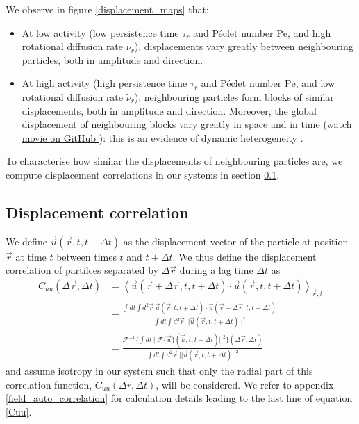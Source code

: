 \documentclass[class=report, float=false, crop=false]{standalone}
\begin{document}
We observe in figure \ref{displacement_maps} that:
\begin{itemize}
  \item At low activity (low persistence time $\tau_r$ and P\'eclet number $\text{Pe}$, and high rotational diffusion rate $\tilde{\nu}_r$), displacements vary greatly between neighbouring particles, both in amplitude and direction.
  \item At high activity (high persistence time $\tau_r$ and P\'eclet number $\text{Pe}$, and low rotational diffusion rate $\tilde{\nu}_r$), neighbouring particles form blocks of similar displacements, both in amplitude and direction. Moreover, the global displacement of neighbouring blocks vary greatly in space and in time (watch \href{https://github.com/yketa/UBC_2018_Wiki/blob/master/presentation_7_30_18/movies/u_Dk8000_Vj1000_Rg2000_Nq1000_Io5000_Tm5000_Bn1000_Pl5000_Mm5000/u_Dk8000_Vj1000_Rg2000_Nq1000_Io5000_Tm5000_Bn1000_Pl5000_Mm5000.mov?raw=true}{movie on GitHub \faGithub}): this is an evidence of dynamic heterogeneity \cite{berthier2011dynamic}.
\end{itemize}
To characterise how similar the displacements of neighbouring particles are, we compute displacement correlations in our systems in section \ref{displacement_correlation}.

\subsection{Displacement correlation}
\label{displacement_correlation}


We define $\vec{u}(\vec{r}, t, t + \Delta t)$ as the displacement vector of the particle at position $\vec{r}$ at time $t$ between times $t$ and $t + \Delta t$. We thus define the displacement correlation of partilces separated by $\Delta \vec{r}$ during a lag time $\Delta t$ as
\begin{equation}
\begin{aligned}
C_{uu}(\Delta \vec{r}, \Delta t) &= \left<\vec{u}(\vec{r}+\Delta\vec{r}, t, t + \Delta t)\cdot\vec{u}(\vec{r}, t, t + \Delta t)\right>_{\vec{r}, t}
\\
&= \frac{\int dt \int d^2\vec{r}~ \vec{u}(\vec{r}, t, t+\Delta t)\cdot\vec{u}(\vec{r} + \Delta \vec{r}, t, t+\Delta t)}{\int dt \int d^2\vec{r}~ ||\vec{u}(\vec{r}, t, t+\Delta t)||^2}
\\
&= \frac{\mathcal{F}^{-1}\{\int dt~ ||\mathcal{F}\{\vec{u}\}(\vec{k}, t, t + \Delta t)||^2\}(\Delta \vec{r}, \Delta t)}{\int dt \int d^2\vec{r}~ ||\vec{u}(\vec{r}, t, t+\Delta t)||^2}
\end{aligned}
\label{Cuu}
\end{equation}
and assume isotropy in our system such that only the radial part of this correlation function, $C_{uu}(\Delta r, \Delta t)$, will be considered. We refer to appendix \ref{field_auto_correlation} for calculation details leading to the last line of equation \ref{Cuu}.\\
\end{document}
